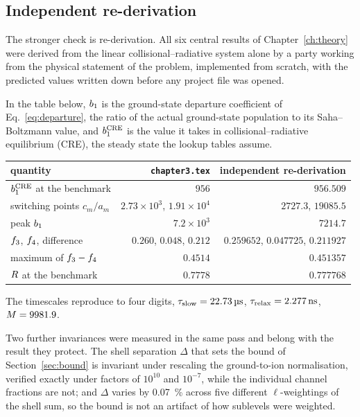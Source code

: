 \subsection{Independent re-derivation}

The stronger check is re-derivation. All six central results of
Chapter~\ref{ch:theory} were derived from the linear collisional--radiative
system alone by a party working from the physical statement of the problem,
implemented from scratch, with the predicted values written down before any
project file was opened.

In the table below, $b_1$ is the ground-state departure coefficient of
Eq.~\eqref{eq:departure}, the ratio of the actual ground-state population to its
Saha--Boltzmann value, and $b_1^{\rm CRE}$ is the value it takes in
collisional--radiative equilibrium (CRE), the steady state the lookup tables
assume.

\begin{center}
\begin{tabular}{lrr}
  \toprule
  quantity & \texttt{chapter3.tex} & independent re-derivation \\
  \midrule
  $b_1^{\rm CRE}$ at the benchmark        & $956$                        & $956.509$ \\
  switching points $c_m/a_m$                & $2.73\times10^{3}$, $1.91\times10^{4}$ & $2727.3$, $19085.5$ \\
  peak $b_1$                              & $7.2\times10^{3}$            & $7214.7$ \\
  $f_{3}$, $f_{4}$, difference       & $0.260$, $0.048$, $0.212$    & $0.259652$, $0.047725$, $0.211927$ \\
  maximum of $f_{3}-f_{4}$          & $0.4514$                     & $0.451357$ \\
  $R$ at the benchmark                  & $0.7778$                     & $0.777768$ \\
  \bottomrule
\end{tabular}
\end{center}

The timescales reproduce to four digits, $\tau_{\mathrm{slow}} = \SI{22.73}{\micro\second}$,
$\tau_{\mathrm{relax}} = \SI{2.277}{\nano\second}$, $M = 9981.9$.

Two further invariances were measured in the same pass and belong with the
result they protect. The shell separation $\Delta$ that sets the bound of
Section~\ref{sec:bound} is invariant under rescaling the ground-to-ion
normalisation, verified exactly under factors of $10^{10}$ and $10^{-7}$, while
the individual channel fractions are not; and $\Delta$ varies by
\SI{0.07}{\percent} across five different $\ell$-weightings of the shell sum, so
the bound is not an artifact of how sublevels were weighted.

